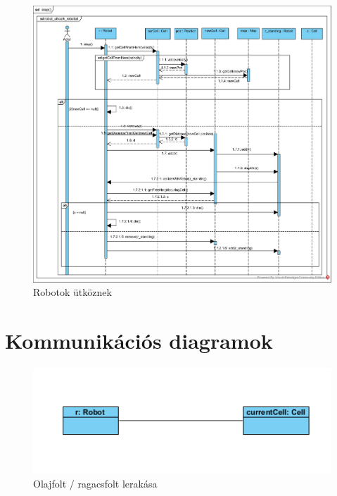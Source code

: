 \clearpage


\begin{figure}[!htbp]
	\begin{center}
		\includegraphics[width=18cm]{./chapters/chapter05/robot_collide_robot.png}
		\caption{Robotok ütköznek}

	\end{center}
\end{figure}

\clearpage

\section{Kommunikációs diagramok}

\begin{figure}[!htbp]
	\begin{center}
		\includegraphics[width=13cm]{./chapters/chapter05/placetrapobject.png}
		\caption{Olajfolt / ragacsfolt lerakása}
	\end{center}
\end{figure}

